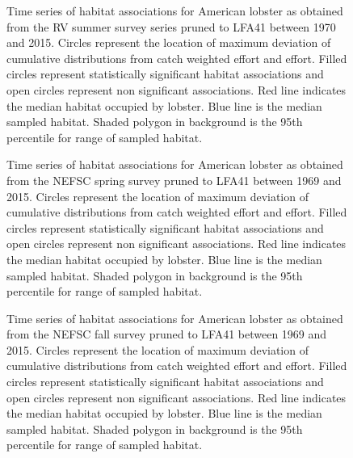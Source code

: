 \documentclass[11pt]{article}
\newcommand{\e}{/backup/bio_data/bio.lobster/figures/} %
\begin{document}


\begin{figure}

    \caption{Time series of habitat associations for American lobster as obtained from the RV summer survey series pruned to LFA41 between 1970 and 2015. Circles represent the location of maximum deviation of cumulative distributions from catch weighted effort and effort. Filled circles represent statistically significant habitat associations and open circles represent non significant associations. Red line indicates
the median habitat occupied by lobster. Blue line is the median sampled habitat. Shaded polygon in background is the 95th percentile for range of sampled habitat.}

\end{figure}


\begin{figure}

    \caption{Time series of habitat associations for American lobster as obtained from the NEFSC spring survey pruned to LFA41 between 1969 and 2015. Circles represent the location of maximum deviation of cumulative distributions from catch weighted effort and effort. Filled circles represent statistically significant habitat associations and open circles represent non significant associations. Red line indicates the median habitat occupied by lobster. Blue line is the median sampled habitat. Shaded polygon in background is the 95th percentile for range of sampled habitat.}

\end{figure}

\begin{figure}

    \caption{Time series of habitat associations for American lobster as obtained from the NEFSC fall survey pruned to LFA41 between 1969 and 2015. Circles represent the location of maximum deviation of cumulative distributions from catch weighted effort and effort. Filled circles represent statistically significant habitat associations and open circles represent non significant associations. Red line indicates
the median habitat occupied by lobster. Blue line is the median sampled habitat. Shaded polygon in background is the 95th percentile for range of sampled habitat.}

\end{figure}
\end{document}
